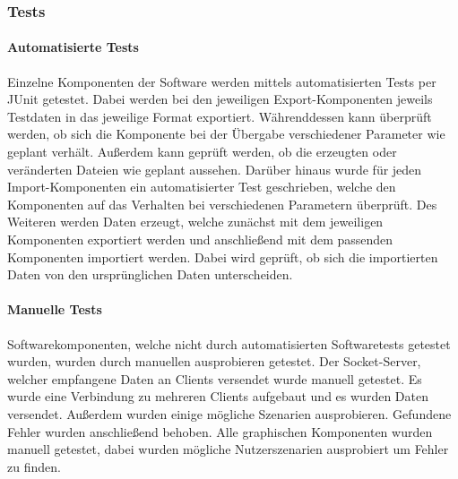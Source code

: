 \subsubsection{Tests}
\paragraph{Automatisierte Tests}
Einzelne Komponenten der Software werden mittels automatisierten Tests per JUnit getestet. Dabei werden bei den jeweiligen Export-Komponenten jeweils Testdaten in das jeweilige Format exportiert. Währenddessen kann überprüft werden, ob sich die Komponente bei der Übergabe verschiedener Parameter wie geplant verhält. Außerdem kann geprüft werden, ob die erzeugten oder veränderten Dateien wie geplant aussehen. Darüber hinaus wurde für jeden Import-Komponenten ein automatisierter Test geschrieben, welche den Komponenten auf das Verhalten bei verschiedenen Parametern überprüft. Des Weiteren werden Daten erzeugt, welche zunächst mit dem jeweiligen Komponenten exportiert werden und anschließend mit dem passenden Komponenten importiert werden. Dabei wird geprüft, ob sich die importierten Daten von den ursprünglichen Daten unterscheiden.

\paragraph{Manuelle Tests}
Softwarekomponenten, welche nicht durch automatisierten Softwaretests getestet wurden, wurden durch manuellen ausprobieren getestet. Der Socket-Server, welcher empfangene Daten an Clients versendet wurde manuell getestet. Es wurde eine Verbindung zu mehreren Clients aufgebaut und es wurden Daten versendet. Außerdem wurden einige mögliche Szenarien ausprobieren. Gefundene Fehler wurden anschließend behoben. Alle graphischen Komponenten wurden manuell getestet, dabei wurden mögliche Nutzerszenarien ausprobiert um Fehler zu finden.